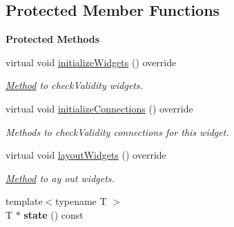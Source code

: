 \subsection*{Protected Member Functions}
\begin{Indent}\textbf{ Protected Methods}\par
\begin{DoxyCompactItemize}
\item 
\mbox{\label{classrev_1_1_view_1_1_anim_state_widget_a9b57b5851b4d5bc4ad327efdb8390261}} 
virtual void \mbox{\hyperlink{classrev_1_1_view_1_1_anim_state_widget_a9b57b5851b4d5bc4ad327efdb8390261}{initialize\+Widgets}} () override
\begin{DoxyCompactList}\small\item\em \mbox{\hyperlink{struct_method}{Method}} to check\+Validity widgets. \end{DoxyCompactList}\item 
\mbox{\label{classrev_1_1_view_1_1_anim_state_widget_a6311f4806d86bf79180f13271b1b1984}} 
virtual void \mbox{\hyperlink{classrev_1_1_view_1_1_anim_state_widget_a6311f4806d86bf79180f13271b1b1984}{initialize\+Connections}} () override
\begin{DoxyCompactList}\small\item\em Methods to check\+Validity connections for this widget. \end{DoxyCompactList}\item 
\mbox{\label{classrev_1_1_view_1_1_anim_state_widget_a7ef5c0ea2341fc1278c736f05350929d}} 
virtual void \mbox{\hyperlink{classrev_1_1_view_1_1_anim_state_widget_a7ef5c0ea2341fc1278c736f05350929d}{layout\+Widgets}} () override
\begin{DoxyCompactList}\small\item\em \mbox{\hyperlink{struct_method}{Method}} to ay out widgets. \end{DoxyCompactList}\item 
\mbox{\label{classrev_1_1_view_1_1_anim_state_widget_af6a12ab8c3acc5bd2d019db7cbeb0276}} 
{\footnotesize template$<$typename T $>$ }\\T $\ast$ {\bfseries state} () const
\end{DoxyCompactItemize}
\end{Indent}

